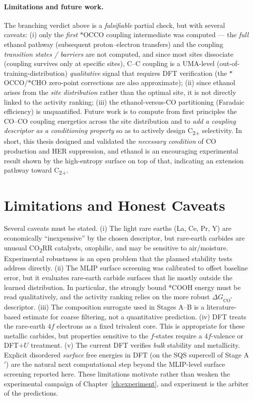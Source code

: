 \documentclass[11pt,a4paper]{report}
\newcommand{\dGCO}{\Delta G_{\mathrm{CO^*}}}
\begin{document}
\paragraph{Limitations and future work.} The branching verdict above is a \emph{falsifiable} partial check, but with
several caveats: (i) only the \emph{first} $*$OCCO coupling intermediate was computed --- the \emph{full} ethanol
pathway (subsequent proton--electron transfers) and the coupling \emph{transition states / barriers} are not computed,
and since most sites dissociate (coupling survives only at specific sites), C--C coupling is a UMA-level (out-of-training-distribution)
\emph{qualitative} signal that requires DFT verification (the $*$OCCO/$*$CHO zero-point corrections are also approximate); (ii) since ethanol
arises from the \emph{site distribution} rather than the optimal site, it is not directly linked to the activity
ranking; (iii) the ethanol-versus-CO partitioning (Faradaic efficiency) is unquantified. Future work is to compute
from first principles the CO--CO coupling energetics across the site distribution and to \emph{add a coupling
descriptor as a conditioning property} so as to actively design C\textsubscript{2+} selectivity. In short, this thesis
designed and validated the \emph{necessary condition} of CO production and HER suppression, and ethanol is an
encouraging experimental result shown by the high-entropy surface on top of that, indicating an extension pathway
toward C\textsubscript{2+}.

\section{Limitations and Honest Caveats}
Several caveats must be stated. (i) The light rare earths (La, Ce, Pr, Y) are economically ``inexpensive'' by the
chosen descriptor, but rare-earth carbides are unusual CO\textsubscript{2}RR catalysts, oxophilic, and may be
sensitive to air/moisture. Experimental robustness is an open problem that the planned stability tests address
directly. (ii) The MLIP surface screening was calibrated to offset baseline error, but it evaluates rare-earth
carbide surfaces that lie mostly outside the learned distribution. In particular, the strongly bound *COOH energy must
be read qualitatively, and the activity ranking relies on the more robust $\dGCO$ descriptor. (iii) The composition
surrogate used in Stages A--B is a literature-based estimate for coarse filtering, not a quantitative prediction.
(iv) DFT treats the rare-earth $4f$ electrons as a fixed trivalent core. This is appropriate for these metallic
carbides, but properties sensitive to the $f$-states require a $4f$-valence or DFT$+U$ treatment. (v) The current DFT
verifies \emph{bulk} stability and metallicity. Explicit disordered \emph{surface} free energies in DFT (on the SQS
supercell of Stage A$'$) are the natural next computational step beyond the MLIP-level surface screening reported here.
These limitations motivate rather than weaken the experimental campaign of Chapter~\ref{ch:experiment}, and experiment
is the arbiter of the predictions.
\end{document}
